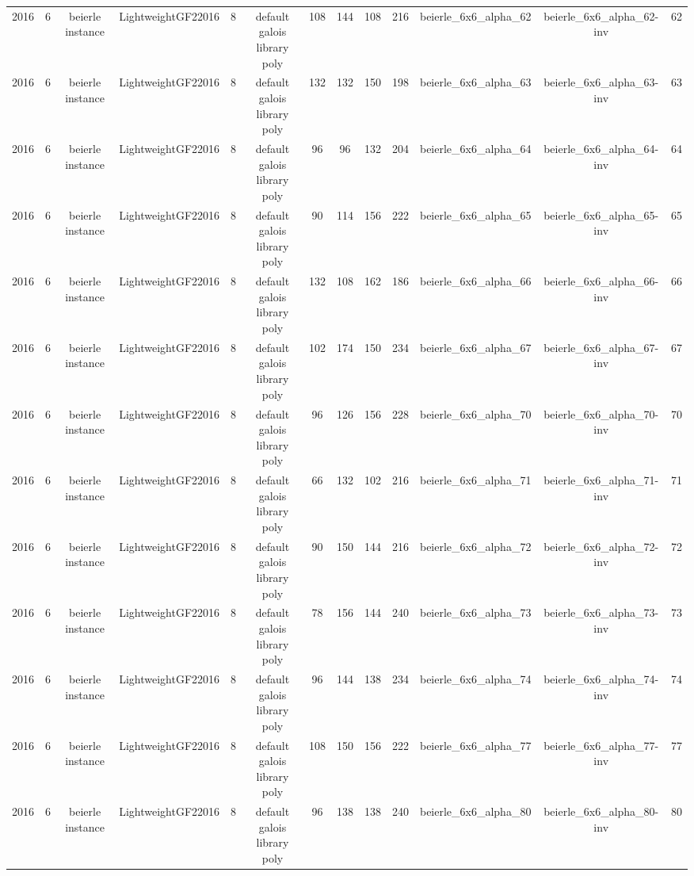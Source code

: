 \begin{tabular}{c c c c c c c c c c c c c}
2016 & 6 & beierle instance & LightweightGF22016 & 8 & default galois library poly & 108 & 144 & 108 & 216 & beierle_6x6_alpha_62 & beierle_6x6_alpha_62-inv & 62 \\
2016 & 6 & beierle instance & LightweightGF22016 & 8 & default galois library poly & 132 & 132 & 150 & 198 & beierle_6x6_alpha_63 & beierle_6x6_alpha_63-inv & 63 \\
2016 & 6 & beierle instance & LightweightGF22016 & 8 & default galois library poly & 96 & 96 & 132 & 204 & beierle_6x6_alpha_64 & beierle_6x6_alpha_64-inv & 64 \\
2016 & 6 & beierle instance & LightweightGF22016 & 8 & default galois library poly & 90 & 114 & 156 & 222 & beierle_6x6_alpha_65 & beierle_6x6_alpha_65-inv & 65 \\
2016 & 6 & beierle instance & LightweightGF22016 & 8 & default galois library poly & 132 & 108 & 162 & 186 & beierle_6x6_alpha_66 & beierle_6x6_alpha_66-inv & 66 \\
2016 & 6 & beierle instance & LightweightGF22016 & 8 & default galois library poly & 102 & 174 & 150 & 234 & beierle_6x6_alpha_67 & beierle_6x6_alpha_67-inv & 67 \\
2016 & 6 & beierle instance & LightweightGF22016 & 8 & default galois library poly & 96 & 126 & 156 & 228 & beierle_6x6_alpha_70 & beierle_6x6_alpha_70-inv & 70 \\
2016 & 6 & beierle instance & LightweightGF22016 & 8 & default galois library poly & 66 & 132 & 102 & 216 & beierle_6x6_alpha_71 & beierle_6x6_alpha_71-inv & 71 \\
2016 & 6 & beierle instance & LightweightGF22016 & 8 & default galois library poly & 90 & 150 & 144 & 216 & beierle_6x6_alpha_72 & beierle_6x6_alpha_72-inv & 72 \\
2016 & 6 & beierle instance & LightweightGF22016 & 8 & default galois library poly & 78 & 156 & 144 & 240 & beierle_6x6_alpha_73 & beierle_6x6_alpha_73-inv & 73 \\
2016 & 6 & beierle instance & LightweightGF22016 & 8 & default galois library poly & 96 & 144 & 138 & 234 & beierle_6x6_alpha_74 & beierle_6x6_alpha_74-inv & 74 \\
2016 & 6 & beierle instance & LightweightGF22016 & 8 & default galois library poly & 108 & 150 & 156 & 222 & beierle_6x6_alpha_77 & beierle_6x6_alpha_77-inv & 77 \\
2016 & 6 & beierle instance & LightweightGF22016 & 8 & default galois library poly & 96 & 138 & 138 & 240 & beierle_6x6_alpha_80 & beierle_6x6_alpha_80-inv & 80 \\

\end{tabular}
